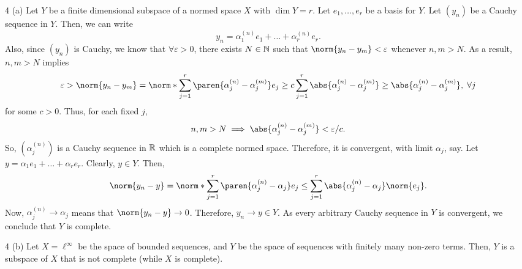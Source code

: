 \documentclass[11pt]{penrose}
\begin{document}
\begin{problem}{4 (a)}
    Let $Y$ be a finite dimensional subspace of a normed space $X$ with $\dim Y = r$. Let $e_{1}, \dots, e_{r}$ be a basis for $Y$. Let $(y_{n})$ be a Cauchy sequence in $Y$. Then, we can write
    \begin{equation*}
        y_{n} = \alpha_{1}^{(n)} e_{1} + \dots + \alpha_{r}^{(n)} e_{r}.
    \end{equation*}
    Also, since $(y_{n})$ is Cauchy, we know that $\forall\varepsilon>0$, there exists $N \in \mathbb{N}$ such that $\norm{ y_{n} - y_{m} } < \varepsilon$ whenever $n, m > N$. As a result, $n, m > N$ implies
    \begin{equation*}
        \varepsilon > \norm{ y_{n} - y_{m} } = \norm*{ \sum_{j=1}^{r} \paren{\alpha_{j}^{(n)} - \alpha_{j}^{(m)}} e_{j} } \geq c \sum_{j=1}^{r} \abs{\alpha_{j}^{(n)} - \alpha_{j}^{(m)}} \geq \abs{\alpha_{j}^{(n)} - \alpha_{j}^{(m)}}, \;\forall j
    \end{equation*}
    for some $c > 0$. Thus, for each fixed $j$,
    \begin{equation*}
        n, m > N \implies \abs{\alpha_{j}^{(n)} - \alpha_{j}^{(m)}} < \varepsilon/c.
    \end{equation*}
    So, $(\alpha_{j}^{(n)})$ is a Cauchy sequence in $\mathbb{R}$ which is a complete normed space. Therefore, it is convergent, with limit $\alpha_{j}$, say. Let $y = \alpha_{1} e_{1} + \dots + \alpha_{r} e_{r}$. Clearly, $y \in Y$. Then,
    \begin{equation*}
        \norm{ y_{n} - y }
        = \norm*{ \sum_{j=1}^{r} \paren{\alpha_{j}^{(n)} - \alpha_{j}} e_{j} }
        \leq \sum_{j=1}^{r} \abs{\alpha_{j}^{(n)} - \alpha_{j}} \norm{e_{j}}.
    \end{equation*}
    Now, $\alpha_{j}^{(n)} \to \alpha_{j}$ means that $\norm{ y_{n} - y } \to 0$. Therefore, $y_{n} \to y \in Y$. As every arbitrary Cauchy sequence in $Y$ is convergent, we conclude that $Y$ is complete.
\end{problem}

\begin{problem}{4 (b)}
    Let $X = \ell^{\infty}$ be the space of bounded sequences, and $Y$ be the space of sequences with finitely many non-zero terms. Then, $Y$ is a subspace of $X$ that is not complete (while $X$ is complete).
\end{problem}
\end{document}

